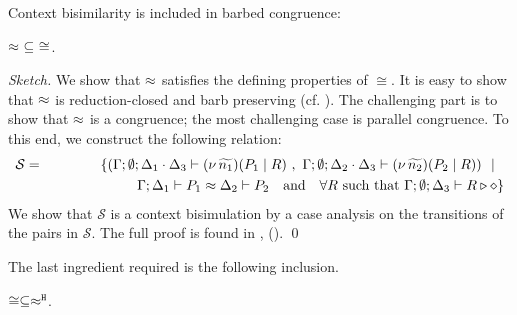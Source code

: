 Context bisimilarity is included in barbed congruence:
\begin{lemma}
	\label{lem:wbc_is_cong}
	$\approx\ \subseteq\ \cong$.
\end{lemma}

\begin{proof}[Sketch]
	We show that $\approx$ satisfies the defining
	properties of $\cong$.
	It is easy to show that $\approx$ is reduction-closed
	and barb preserving (cf. ).
		The challenging part is
	to show that $\approx$ is a congruence; the most challenging
	case is parallel congruence.
	To this end, we construct the following relation:
%
	\begin{eqnarray*}
		\mathcal{S} &=&	\set{
				(\Gamma; \emptyset; \Delta_1 \cat \Delta_3 \proves \newsp{\widetilde{n_1}}{P_1 \Par R} %
				\ ,\ 
				\Gamma; \emptyset; \Delta_2 \cat \Delta_3 \proves \newsp{\widetilde{n_2}}{P_2 \Par R})
				\setbar \\
		& &		\qquad \qquad\qquad \horel{\Gamma}{\Delta_1}{P_1}{\wbc}{\Delta_2}{P_2} \quad \mbox{and} \quad
				\forall R \mbox{ such that }\Gamma; \emptyset; \Delta_3 \proves R \hastype \Proc}
	\end{eqnarray*}
%
	We show that $\mathcal{S}$ is a context bisimulation
	by  a case analysis on the transitions of the pairs in $\mathcal{S}$.
	The full proof is found  in \appref{app:sub_coinc}, 
	 ().
	\qed
\end{proof}

The last ingredient required is the following inclusion.

\begin{lemma}
	\label{lem:cong_is_wb}
	$\cong \subseteq \approx^\mathtt{H}$.
\end{lemma}

